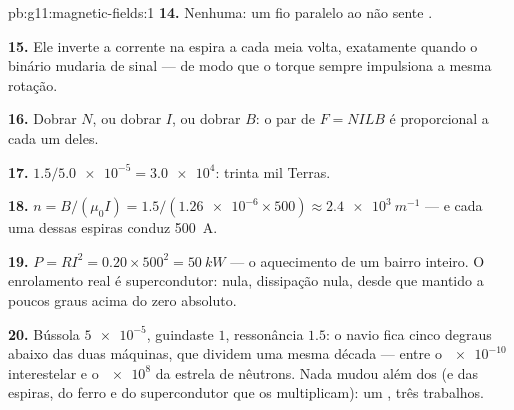 \begin{solution}{pb:g11:magnetic-fields:1}
\textbf{14.} Nenhuma: um fio paralelo ao  não sente .

\textbf{15.} Ele inverte a corrente na espira a cada meia volta,
exatamente quando o binário mudaria de sinal --- de modo que o torque
sempre impulsiona a mesma rotação.

\textbf{16.} Dobrar $N$, ou dobrar $I$, ou dobrar $B$: o par de 
$F = NILB$ é proporcional a cada um deles.

\textbf{17.} $1.5 / \num{5.0e-5} = \num{3.0e4}$: trinta mil Terras.

\textbf{18.} $n = B/(\mu_0 I) = 1.5 / (\num{1.26e-6} \times 500)
\approx \qty{2.4e3}{m^{-1}}$ --- e cada uma dessas espiras conduz
\qty{500}{A}.

\textbf{19.} $P = RI^2 = 0.20 \times 500^2 = \qty{50}{kW}$ --- o
aquecimento de um bairro inteiro. O enrolamento real é supercondutor:
 nula, dissipação nula, desde que mantido a poucos graus
acima do zero absoluto.

\textbf{20.} Bússola $\num{5e-5}$, guindaste $1$, ressonância $1.5$: o
navio fica cinco degraus abaixo das duas máquinas, que dividem uma mesma
década --- entre o $\num{e-10}$ interestelar e o $\num{e8}$ da estrela de
nêutrons. Nada mudou além dos  (e das espiras, do ferro e do
supercondutor que os multiplicam): um , três trabalhos.
\end{solution}
